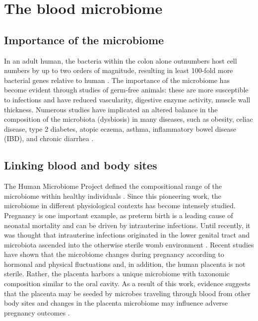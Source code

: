 \chapter{The blood microbiome}

\section{Importance of the microbiome}

In an adult human, the bacteria within the colon alone outnumbers host cell numbers by up to two orders of magnitude, resulting in least 100-fold more bacterial genes relative to human \cite{Brenchley:2012bm}. The importance of the microbiome has become evident through studies of germ-free animals: these are more susceptible to infections and have reduced vascularity, digestive enzyme activity, muscle wall thickness. Numerous studies have implicated an altered balance in the composition of the microbiota (dysbiosis) in many diseases, such as obesity, celiac disease, type 2 diabetes, atopic eczema, asthma, inflammatory bowel disease (IBD), and chronic diarrhea  \cite{Brenchley:2012bm}.

\section{Linking blood and body sites}

The Human Microbiome Project defined the compositional range of the microbiome within healthy individuals \cite{Consortium:2012bb}. Since this pioneering work, the microbiome in different physiological contexts has become intensely studied. Pregnancy is one important example, as preterm birth is a leading cause of neonatal mortality and can be driven by intrauterine infections. Until recently, it was thought that intrauterine infections originated in the lower genital tract and microbiota ascended into the otherwise sterile womb environment \cite{Prince:2014gx}. Recent studies have shown that the microbiome changes during pregnancy according to hormonal and physical fluctuations \cite{Koren:2012ji} and, in addition, the human placenta is not sterile. Rather, the placenta harbors a unique microbiome with taxonomic composition similar to the oral cavity. As a result of this work, evidence suggests that the placenta may be seeded by microbes traveling through blood from other body sites and changes in the placenta microbiome may influence adverse pregnancy outcomes \cite{Aagaard:2014vk}.

